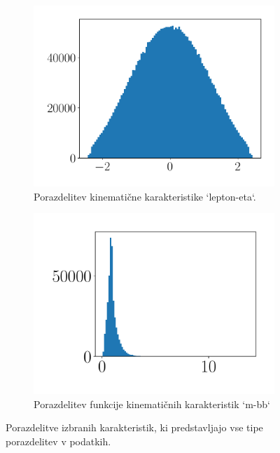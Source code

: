 \documentclass{article}
\begin{document}
\begin{figure}[H]
\begin{subfigure}{0.4\textwidth}
    \includegraphics[width=\linewidth]{images/lepton-eta.pdf}
	\caption{Porazdelitev kinemati\v{c}ne karakteristike `lepton-eta`.}
\end{subfigure}
\begin{subfigure}{0.4\textwidth}
    \includegraphics[width=\linewidth]{images/m_bb.pdf}
	\caption{Porazdelitev funkcije kinemati\v{c}nih karakteristik `m-bb`}
\end{subfigure}

\caption{Porazdelitve izbranih karakteristik, ki predstavljajo vse tipe porazdelitev v podatkih.}
\label{fig:distributions}
\end{figure}
\end{document}
